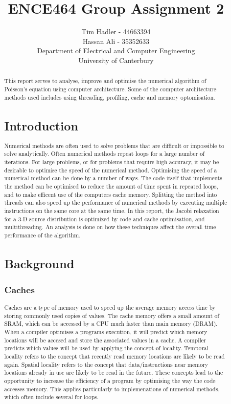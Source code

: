 \documentclass[a4paper, 12pt]{article}
\title{\vspace{-1cm} ENCE464 Group Assignment 2}
\author{Tim Hadler - 44663394 \\ Hassan Ali -  35352633\\
	\small Department of Electrical and Computer Engineering\\
	\small University of Canterbury}
\begin{document}
\maketitle

\begin{abstract}

This report serves to analyse, improve and optimise the numerical algorithm of Poisson's equation using computer architecture. Some of the computer architecture methods used includes using threading, profiling, cache and memory optomisation.


\tableofcontents

\pagebreak
	
\section{Introduction}
	Numerical methods are often used to solve problems that are difficult or impossible to solve analytically. Often numerical methods repeat loops for a large number of iterations. For large problems, or for problems that require high accuracy, it may be desirable to optimise the speed of the numerical method. Optimising the speed of a numerical method can be done by a number of ways. The code itself that implements the method can be optimised to reduce the amount of time spent in repeated loops, and to make efficent use of the computers cache memory. Splitting the method into threads can also speed up the performance of numerical methods by executing multiple instructions on the same core at the same time. In this report, the Jacobi relaxation for a 3-D source distribution is optimized by code and cache optimisation, and multithreading. An analysis is done on how these techniques affect the overall time performance of the algorithm. 
	

\section{Background}

\subsection{Caches}
Caches are a type of memory used to speed up the average memory access time by storing commonly used copies of values. The cache memory offers a small amount of SRAM, which can be accessed by a CPU much faster than main memory (DRAM). When a compiler optimises a programs execution, it will predict which memory locations will be accesed and store the associated values in a cache. A compiler predicts which values will be used by applying the concept of locality. Temporal locality refers to the concept that recently read memory locations are likely to be read again. Spatial locality refers to the concept that data/instructions near memory locations already in use are likely to be read in the future. These concepts lead to the opportunity to increase the efficiency of a program by optimising the way the code accesses memory. This applies particularly to implemenations of numerical methods, which often include several for loops. 


\end{abstract}
\end{document}
